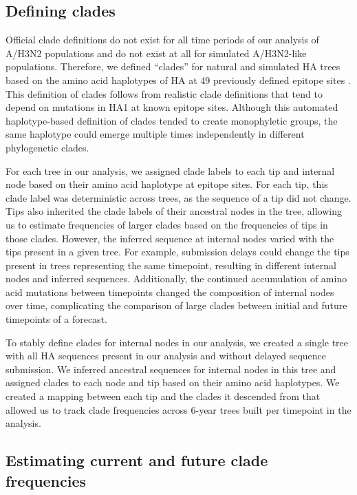 \documentclass[9pt,lineno]{elife}
\begin{document}
\subsection{Defining clades}

Official clade definitions do not exist for all time periods of our analysis of A/H3N2 populations and do not exist at all for simulated A/H3N2-like populations.
Therefore, we defined ``clades'' for natural and simulated HA trees based on the amino acid haplotypes of HA at 49 previously defined epitope sites \citep{Luksza:2014hj}.
This definition of clades follows from realistic clade definitions that tend to depend on mutations in HA1 at known epitope sites.
Although this automated haplotype-based definition of clades tended to create monophyletic groups, the same haplotype could emerge multiple times independently in different phylogenetic clades.

For each tree in our analysis, we assigned clade labels to each tip and internal node based on their amino acid haplotype at epitope sites.
For each tip, this clade label was deterministic across trees, as the sequence of a tip did not change.
Tips also inherited the clade labels of their ancestral nodes in the tree, allowing us to estimate frequencies of larger clades based on the frequencies of tips in those clades.
However, the inferred sequence at internal nodes varied with the tips present in a given tree.
For example, submission delays could change the tips present in trees representing the same timepoint, resulting in different internal nodes and inferred sequences.
Additionally, the continued accumulation of amino acid mutations between timepoints changed the composition of internal nodes over time, complicating the comparison of large clades between initial and future timepoints of a forecast.

To stably define clades for internal nodes in our analysis, we created a single tree with all HA sequences present in our analysis and without delayed sequence submission.
We inferred ancestral sequences for internal nodes in this tree and assigned clades to each node and tip based on their amino acid haplotypes.
We created a mapping between each tip and the clades it descended from that allowed us to track clade frequencies across 6-year trees built per timepoint in the analysis.

\subsection{Estimating current and future clade frequencies}
\end{document}
